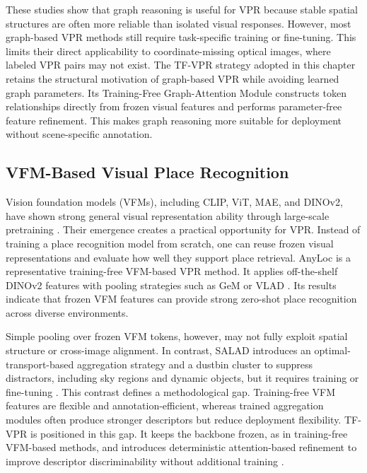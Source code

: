 These studies show that graph reasoning is useful for VPR because stable spatial structures are often more reliable than isolated visual responses. However, most graph-based VPR methods still require task-specific training or fine-tuning. This limits their direct applicability to coordinate-missing optical images, where labeled VPR pairs may not exist. The TF-VPR strategy adopted in this chapter retains the structural motivation of graph-based VPR while avoiding learned graph parameters. Its Training-Free Graph-Attention Module constructs token relationships directly from frozen visual features and performs parameter-free feature refinement. This makes graph reasoning more suitable for deployment without scene-specific annotation.

\subsection{VFM-Based Visual Place Recognition}
Vision foundation models (VFMs), including CLIP, ViT, MAE, and DINOv2, have shown strong general visual representation ability through large-scale pretraining \cite{radford2021clip,dosovitskiy2020vit,he2022mae,oquab2023dinov2}. Their emergence creates a practical opportunity for VPR. Instead of training a place recognition model from scratch, one can reuse frozen visual representations and evaluate how well they support place retrieval. AnyLoc is a representative training-free VFM-based VPR method. It applies off-the-shelf DINOv2 features with pooling strategies such as GeM or VLAD \cite{keetha2024anyloc}. Its results indicate that frozen VFM features can provide strong zero-shot place recognition across diverse environments.

Simple pooling over frozen VFM tokens, however, may not fully exploit spatial structure or cross-image alignment. In contrast, SALAD introduces an optimal-transport-based aggregation strategy and a dustbin cluster to suppress distractors, including sky regions and dynamic objects, but it requires training or fine-tuning \cite{izquierdo2024salad}. This contrast defines a methodological gap. Training-free VFM features are flexible and annotation-efficient, whereas trained aggregation modules often produce stronger descriptors but reduce deployment flexibility. TF-VPR is positioned in this gap. It keeps the backbone frozen, as in training-free VFM-based methods, and introduces deterministic attention-based refinement to improve descriptor discriminability without additional training \cite{wang2026tfvpr}.

